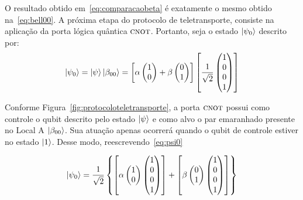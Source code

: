 O resultado obtido em~\eqref{eq:comparacaobeta} é exatamente o mesmo obtido na~\eqref{eq:bell00}.
A próxima etapa do protocolo de teletransporte, consiste na aplicação da porta lógica quântica \(\operatorname{\textsc{cnot}}\). Portanto, seja o estado $\ket{\psi_0}$ descrito por:
\begin{equation}\label{eq:psi0}
\ket{\psi_0}=\ket{\psi}\ket{\beta_{00}}=\left[\alpha \begin{pmatrix}
1 \\
0 
\end{pmatrix} + \beta \begin{pmatrix}
0 \\
1
\end{pmatrix}\right] \left[\frac{1}{\sqrt{2}} \begin{pmatrix}
1 \\
0 \\
0 \\
1
\end{pmatrix}\right]
\end{equation}

Conforme Figura~\ref{fig:protocoloteletransporte}, a porta \(\operatorname{\textsc{cnot}}\) possui como controle o qubit descrito pelo estado $\ket{\psi}$ e como alvo o par emaranhado presente no Local A $\ket{\beta_{00}}$. Sua atuação apenas ocorrerá quando o qubit de controle estiver no estado $\ket{1}$. Desse modo, reescrevendo~\eqref{eq:psi0}

\begin{equation}\label{eq:psi0cnot}
\ket{\psi_0} = \frac{1}{\sqrt{2}}\left\{\left[\alpha \begin{pmatrix}
1 \\
0 
\end{pmatrix}  \begin{pmatrix}
1 \\
0 \\
0 \\
1
\end{pmatrix}\right] + \left[\beta \begin{pmatrix}
0 \\
1
\end{pmatrix}  \begin{pmatrix}
1 \\
0 \\
0 \\
1
\end{pmatrix}\right] \right\}
\end{equation}

